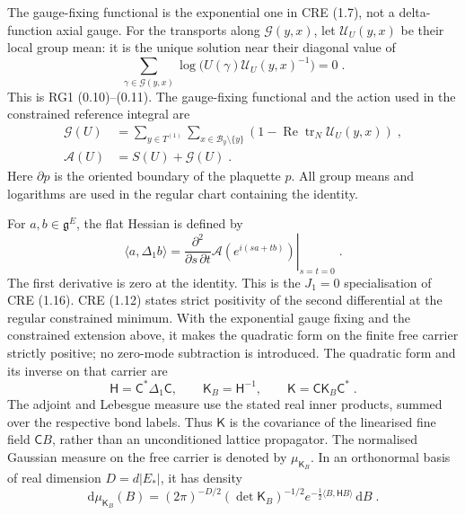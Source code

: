 \documentclass[11pt]{article}
\newcommand{\dd}{\mathrm{d}}
\newcommand{\tr}{\operatorname{tr}}
\begin{document}
The gauge-fixing functional is the exponential one in CRE (1.7), not a delta-function axial gauge. For the transports along $\mathcal G(y,x)$, let $\mathcal U_U(y,x)$ be their local group mean: it is the unique solution near their diagonal value of
\begin{equation}
    \sum_{\gamma\in\mathcal G(y,x)}
        \log\bigl(U(\gamma)\mathcal U_U(y,x)^{-1}\bigr)=0\;.
\end{equation}
This is RG1 (0.10)--(0.11). The gauge-fixing functional and the action used in the constrained reference integral are
\begin{equation}\label{eq:action-primitive}
    \begin{aligned}
        \mathscr G(U)&=\sum_{y\in T^{(1)}}
            \sum_{x\in\mathcal B_y\setminus\{y\}}
                (1-\operatorname{Re}\tr_N\mathcal U_U(y,x))\;,\\
        \mathscr A(U)&=S(U)+\mathscr G(U)\;.
    \end{aligned}
\end{equation}
Here $\partial p$ is the oriented boundary of the plaquette $p$. All group means and logarithms are used in the regular chart containing the identity.

For $a,b\in\mathfrak g^E$, the flat Hessian is defined by
\begin{equation}
    \langle a,\Delta_1b\rangle
        =\left.\frac{\partial^2}{\partial s\,\partial t}
            \mathscr A(e^{i(sa+tb)})\right|_{s=t=0}\;.
\end{equation}
The first derivative is zero at the identity. This is the $J_1=0$ specialisation of CRE (1.16). CRE (1.12) states strict positivity of the second differential at the regular constrained minimum. With the exponential gauge fixing and the constrained extension above, it makes the quadratic form on the finite free carrier strictly positive; no zero-mode subtraction is introduced. The quadratic form and its inverse on that carrier are
\begin{equation}\label{eq:flat-covariance}
    \mathsf H=\mathsf C^*\Delta_1\mathsf C,
    \qquad \mathsf K_B=\mathsf H^{-1},
    \qquad \mathsf K=\mathsf C\mathsf K_B\mathsf C^*\;.
\end{equation}
The adjoint and Lebesgue measure use the stated real inner products, summed over the respective bond labels. Thus $\mathsf K$ is the covariance of the linearised fine field $\mathsf C B$, rather than an unconditioned lattice propagator. The normalised Gaussian measure on the free carrier is denoted by $\mu_{\mathsf K_B}$. In an orthonormal basis of real dimension $D=d|E_*|$, it has density
\begin{equation}
    \dd\mu_{\mathsf K_B}(B)
        =(2\pi)^{-D/2}(\det\mathsf K_B)^{-1/2}
            e^{-\frac{1}{2}\langle B,\mathsf H B\rangle}\,\dd B\;.
\end{equation}
\end{document}
